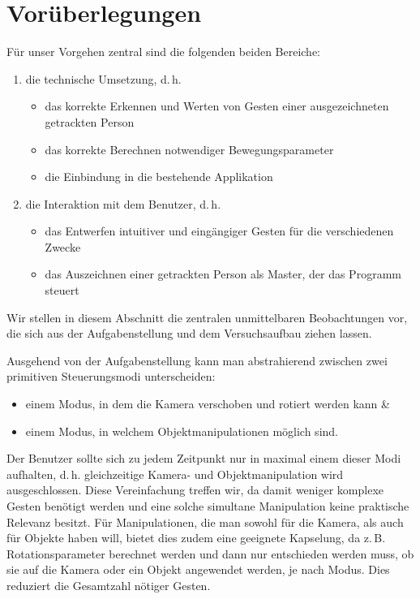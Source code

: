\documentclass[12pt,a4paper]{article}
\begin{document}
\section{Vorüberlegungen}
	Für unser Vorgehen zentral sind die folgenden beiden Bereiche:
	\begin{enumerate}
		\item die technische Umsetzung, d.\,h.
		\begin{itemize}
		\item das korrekte Erkennen und Werten von Gesten einer ausgezeichneten getrackten Person
		\item das korrekte Berechnen notwendiger Bewegungsparameter
		\item die Einbindung in die bestehende Applikation
		\end{itemize}
		\item die Interaktion mit dem Benutzer, d.\,h.
		\begin{itemize}
		\item das Entwerfen intuitiver und eingängiger Gesten für die verschiedenen Zwecke
		\item das Auszeichnen einer getrackten Person als \glqq Master\grqq, der das Programm steuert
		\end{itemize}
	\end{enumerate}
	Wir stellen in diesem Abschnitt die zentralen unmittelbaren Beobachtungen vor, die sich aus der Aufgabenstellung und dem Versuchsaufbau ziehen lassen.\par\bigskip
	Ausgehend von der Aufgabenstellung kann man abstrahierend zwischen zwei primitiven Steuerungsmodi unterscheiden:
	\begin{itemize}
	\item einem Modus, in dem die Kamera verschoben und rotiert werden kann \&
	\item einem Modus, in welchem Objektmanipulationen möglich sind.
	\end{itemize}
	Der Benutzer sollte sich zu jedem Zeitpunkt nur in maximal einem dieser Modi aufhalten, d.\,h. gleichzeitige Kamera- und Objektmanipulation wird ausgeschlossen. Diese Vereinfachung treffen wir, da damit weniger komplexe Gesten benötigt werden und eine solche simultane Manipulation keine praktische Relevanz besitzt. Für Manipulationen, die man sowohl für die Kamera, als auch für Objekte haben will, bietet dies zudem eine geeignete Kapselung, da z.\,B. Rotationsparameter berechnet werden und dann nur entschieden werden muss, ob sie auf die Kamera oder ein Objekt angewendet werden, je nach Modus. Dies reduziert die Gesamtzahl nötiger Gesten.\par\medskip
\end{document}
